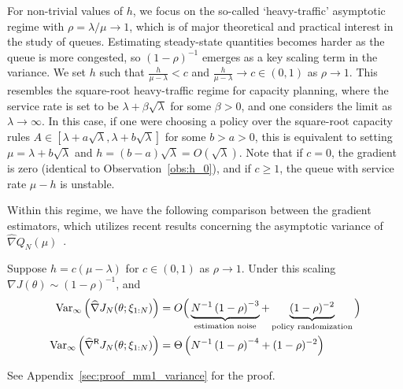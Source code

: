 For non-trivial values of $h$, we focus on the so-called `heavy-traffic' asymptotic regime with $\rho=\lambda/\mu \to 1$, which is of major theoretical and practical interest in the study of queues. Estimating steady-state quantities becomes harder as the queue is more congested, so $(1 - \rho)^{-1}$ emerges as a key scaling term in the variance. 
We set $h$ such that $\frac{h}{\mu - \lambda}<c$ and $\frac{h}{\mu - \lambda}\to c \in (0,1)$ as $\rho \to 1$. This resembles the square-root heavy-traffic regime for capacity planning, where the service rate is set to be $\lambda + \beta \sqrt{\lambda}$ for some $\beta > 0$, and one considers the limit as $\lambda \to \infty$. In this case, if one were choosing a policy over the square-root capacity rules $A\in[\lambda + a \sqrt{\lambda}, \lambda + b \sqrt{\lambda}]$ for some $b>a>0$, this is equivalent to setting $\mu = \lambda + b\sqrt{\lambda}$ and $h = (b - a) \sqrt{\lambda} = O(\sqrt{\lambda})$. Note that if $c = 0$, the gradient is zero (identical to Observation~\ref{obs:h_0}), and if $c \geq 1$, the queue with service rate $\mu-h$ is unstable.

Within this regime, we have the following comparison between the gradient estimators, which utilizes recent results concerning the asymptotic variance of $\widehat{\nabla}Q_N(\mu)$~\cite{hu2023comparison}.
\begin{theorem}
\label{thm:mm1_variance}
Suppose $h = c(\mu - \lambda)$ for $c\in(0,1)$ as $\rho \to 1$. Under this scaling
$\nabla J(\theta) \sim (1-\rho)^{-1}$,
and
\begin{align}
{\rm Var}_{\infty}\left(\widehat{\nabla} J_{N}(\theta; \xi_{1:N}) \right) 
&= O \Big( \underbrace{N^{-1}  \left(1 - \rho \right)^{-3}}_{\text{estimation noise}} + \underbrace{(1-\rho)^{-2}}_{\text{policy randomization}} \Big) \label{eq:V_R}\\ 
{\rm Var}_{\infty}\left(\widehat{\nabla}^{\mathsf{R}} J_{N}(\theta; \xi_{1:N}) \right) &= \Theta 
\left( N^{-1} \left(1 -\rho\right)^{-4}
+ (1-\rho)^{-2}
\right) \label{eq:V_P}
\end{align}
\end{theorem}
\noindent See Appendix~\ref{sec:proof_mm1_variance} for the proof.

